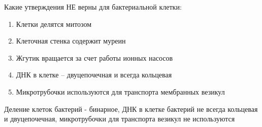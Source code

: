
Какие утверждения НЕ верны для бактериальной клетки:

\begin{enumerate}
    \item Клетки делятся митозом
    \item Клеточная стенка содержит муреин
    \item Жгутик вращается за счет работы ионных насосов
    \item ДНК в клетке – двуцепочечная и всегда кольцевая
    \item Микротрубочки используются для транспорта мембранных везикул
\end{enumerate}


\explanationSection

Деление клеток бактерий - бинарное, ДНК в клетке бактерий не всегда кольцевая и двуцепочечная, микротрубочки для транспорта везикул не используются

